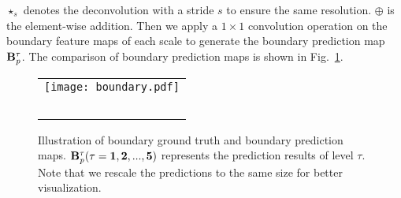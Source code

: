 \documentclass[journal]{IEEEtran}
\begin{document}
${\star}_{s}$ denotes the deconvolution with a stride $s$ to ensure the same resolution.
$\oplus$ is the element-wise addition.
Then we apply a $1\times1$ convolution operation on the boundary feature maps of each scale to generate the boundary prediction map $\bf{B}^{\tau}_{\it{p}}$.
The comparison of boundary prediction maps is shown in Fig.~\ref{boundary}.
\begin{figure}[!t]
\centering
\begin{tabular}{@{}c}
\texttt{[image: boundary.pdf]} \\\
\end{tabular}
\caption{Illustration of boundary ground truth and boundary prediction maps. $\bf{B}^{\tau}_{\it{p}} (\tau=1,2,...,5)$ represents the prediction results of level $\tau$. Note that we rescale the predictions to the same size for better visualization.}
\vspace{-6mm}
\label{boundary}
\end{figure}
\vspace{-2mm}
\end{document}
